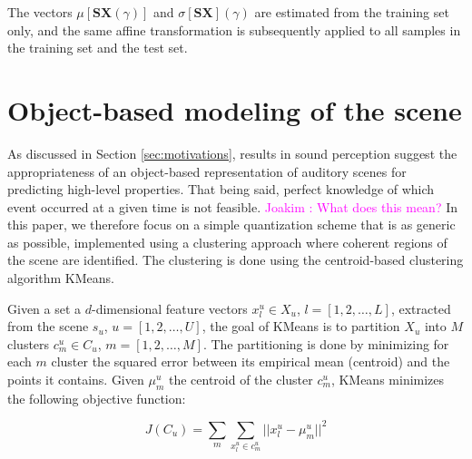 \documentclass[journal]{IEEEtran}
\newcommand{\ja}[1]{\textcolor{magenta}{Joakim : #1}}
\begin{document}
The vectors $\mu[\mathbf{S}\boldsymbol{X}(\gamma)]$ and $\sigma[\mathbf{S}\boldsymbol{X}](\gamma)$ are estimated from the training set only, and the same affine transformation is subsequently applied to all samples in the training set and the test set.

\section{Object-based modeling of the scene}
\label{sec:object}



As discussed in Section \ref{sec:motivations}, results in sound perception suggest the appropriateness of an object-based representation of auditory scenes for predicting high-level properties. That being said, perfect knowledge of which event occurred at a given time is not feasible. \ja{What does this mean?} In this paper, we therefore focus on a simple quantization scheme that is as generic as possible, implemented using a clustering approach where coherent regions of the scene are identified. The clustering is done using the centroid-based clustering algorithm KMeans.

Given a set a $d$-dimensional feature vectors $x_l^u\in X_u$, $l=[1,2,\ldots,L]$, extracted from the scene $s_u$, $u=[1,2,\ldots,U]$, the goal of KMeans is to partition $X_u$ into $M$ clusters $c^u_m\in C_u$, $m=[1,2,\ldots,M]$. The partitioning is done by minimizing for each $m$ cluster the squared error between its empirical mean (centroid) and the points it contains. Given $\mu_m^u$ the centroid of the cluster $c_m^u$, KMeans minimizes the following objective function:

\begin{equation}
J(C_u)=\sum\limits_{m} \sum_{x^u_l\in c^u_m} \vert \vert x_l^u - \mu_m^u \vert \vert^2
\end{equation}
\end{document}
